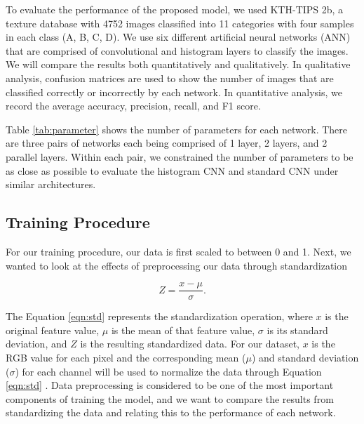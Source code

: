 \documentclass[10pt,twocolumn,letterpaper]{article}
\begin{document}
To evaluate the performance of the proposed model, we used KTH-TIPS 2b, a texture database with 4752 images classified into 11 categories with four samples in each class (A, B, C, D). We use six different artificial neural networks (ANN) that are comprised of convolutional and histogram layers to classify the images. We will compare the results both quantitatively and qualitatively. In qualitative analysis, confusion matrices are used to show the number of images that are classified correctly or incorrectly by each network. In quantitative analysis, we record the average accuracy, precision, recall, and F1 score.




Table \ref{tab:parameter} shows the number of parameters for each network. There are three pairs of networks each being comprised of 1 layer, 2 layers, and 2 parallel layers. Within each pair, we constrained the number of parameters to be as close as possible to evaluate the histogram CNN and standard CNN under similar architectures.

\subsection{Training Procedure}
For our training procedure, our data is first scaled to between 0 and 1. Next, we wanted to look at the effects of preprocessing our data through standardization

\begin{equation}
\label{eqn:std}
Z = \dfrac{x - \mu}{\sigma}.
\end{equation}

The Equation \ref{eqn:std} represents the standardization operation, where $x$ is the original feature value, $\mu$ is the mean of that feature value, $\sigma$  is its standard deviation, and $Z$ is the resulting standardized data. 
For our dataset, $x$ is the RGB value for each pixel and the corresponding mean ($\mu$) and standard deviation ($\sigma$) for each channel will be used to normalize the data through Equation \ref{eqn:std} . Data preprocessing is considered to be one of the most important components of training the model, and we want to compare the results from standardizing the data and relating this to the performance of each network. \\
\end{document}
